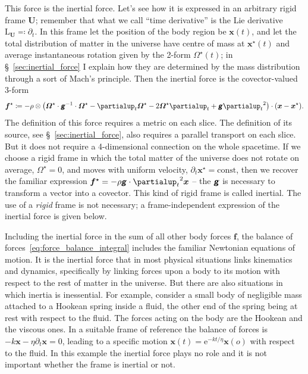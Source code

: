 \documentclass[\ifafour a4paper,12pt,\else a5paper,10pt,\fi%
onecolumn,oneside,article,%
british%
]{memoir}
\theoremstyle{remark}
\theoremstyle{innote}
\newcommand*{\mathte}[1]{\textbf{\textit{\textsf{#1}}}}
\newcommand*{\de}{\partialup}%
\newcommand*{\e}{\mathrm{e}}%
\newcommand*{\defd}{\coloneqq}
\newcommand*{\defs}{\eqqcolon}
\renewcommand*{\|}[1][]{\nonscript\,#1\vert\nonscript\;\mathopen{}}
\newcommand*{\sect}{\S}%
\newcommand*{\Li}{\mathrm{L}}
\newcommand*{\yd}{N}
\newcommand*{\ybb}{f}
\newcommand*{\yb}{\bm{\ybb}}
\newcommand*{\ybi}{\yb^{\mathord{\star}}}
\newcommand*{\yxxt}{x}
\newcommand*{\yxt}{\bm{\yxxt}}
\newcommand*{\yxto}{\bm{\yxxt}^{\mathord{\star}}}
\newcommand*{\yomm}{\varOmega}
\newcommand*{\yom}{\bm{\yomm}^{\mathord{\star}}}
\newcommand*{\yFF}{U}
\newcommand*{\yF}{\bm{\yFF}}
\newcommand*{\ygg}{g}
\newcommand*{\yg}{\mathte{\ygg}}
\begin{document}
This force is the inertial force. Let's see how it is expressed in an
arbitrary rigid frame $\yF$; remember that what we call \enquote{time
  derivative} is the Lie derivative $\Li_{\yF} \defs \de_t$. In this frame
let the position of the body region be $\yxt(t)$, and let the total
distribution of matter in the universe have centre of mass at $\yxto(t)$
and average instantaneous rotation given by the 2-form $\yom(t)$; in
\sect~\ref{sec:inertial_force} I explain how they are determined by the
mass distribution through a sort of Mach's principle. Then the inertial
force is the covector-valued 3-form
\begin{equation}
  \label{eq:inertial_force}
  \ybi \defd  -\rho \otimes
  \bigl(\yom\cdot\yg^{-1}\cdot\yom  - \de_t\yom - 2\yom\de_t  + \yg{\de_t}^2\bigr)
  \cdot(\yxt-\yxto).
\end{equation}
The definition of this force requires a metric on each slice. The definition
of its source, see \sect~\ref{sec:inertial_force}, also requires a parallel
transport on each slice. But it does not require a 4-dimensional connection
on the whole spacetime. If we choose a rigid frame in which the total
matter of the universe does not rotate on average, $\yom=0$, and moves with
uniform velocity, $\de_t\yxto=\text{const}$, then we recover the familiar
expression $\ybi = -\rho \yg\cdot{\de_t}^2\yxt$ -- the $\yg$ is necessary to
transform a vector into a covector. This kind of rigid frame is called
inertial. The use of a \emph{rigid} frame is not necessary; a
frame-independent expression of the inertial force is given below.

Including the inertial force in the sum of all other body forces $\yb$, the
balance of forces~\eqref{eq:force_balance_integral} includes the familiar
Newtonian equations of motion. It is the inertial force that in most
physical situations links kinematics and dynamics, specifically by linking
forces upon a body to its motion with respect to the rest of matter in the
universe. But there are also situations in which inertia is inessential.
For example, consider a small body of negligible mass attached to a Hookean
spring inside a fluid, the other end of the spring being at rest with
respect to the fluid. The forces acting on the body are the Hookean and the
viscous ones. In a suitable frame of reference the balance of forces is
$-k\yxt - \eta\de_t\yxt = 0$, leading to a specific motion
$\yxt(t) = \e^{-kt/\eta}\yxt(o)$ with respect to the fluid. In this example
the inertial force plays no role and it is not important whether the frame
is inertial or not.
\end{document}
